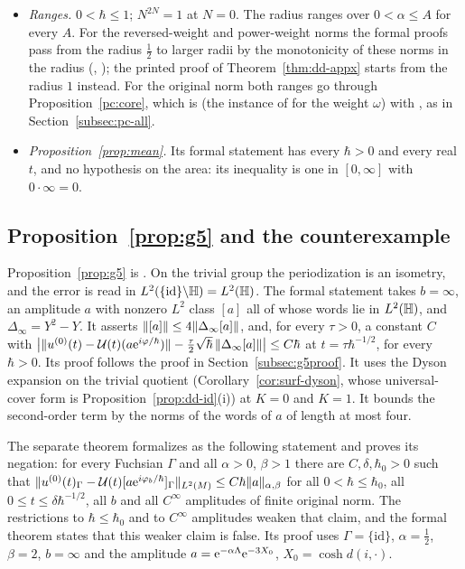 \begin{itemize}
, ).
\item \emph{Ranges.} $0<\hbar\le1$; $N^{2N}=1$ at $N=0$. The radius ranges over $0<\alpha\le A$ for every $A$. For the reversed-weight
and power-weight norms the formal proofs pass from the radius $\tfrac12$ to larger radii by the monotonicity of these norms in the
radius (, ); the printed proof of Theorem~\ref{thm:dd-appx} starts from the radius $1$ instead.
For the original norm both ranges go through Proposition~\ref{pc:core}, which is
 (the instance of  for the weight $\omega$) with , as in Section~\ref{subsec:pc-all}.
\item \emph{Proposition~\ref{prop:mean}.} Its formal statement has every $\hbar>0$ and every real $t$, and no hypothesis on the area:
its inequality is one in $[0,\infty]$ with $0\cdot\infty=0$.
\end{itemize}

\subsection{Proposition~\texorpdfstring{\ref{prop:g5}}{1.6} and the counterexample}\label{rem:g5-lean}
Proposition~\ref{prop:g5} is . On the trivial group the periodization is an isometry, and the error is read in
$L^2(\{\mathrm{id}\}\backslash\mathbb{H})=L^2(\mathbb{H})$. The formal statement takes $b=\infty$, an amplitude $a$ with nonzero $L^2$ class $[a]$ all of whose
words lie in $L^2(\mathbb{H})$, and $\Delta_\infty=Y^2-Y$. It asserts $\lVert [a]\rVert\le4\lVert \Delta_\infty[a]\rVert$, and, for every $\tau>0$, a constant $C$ with
$\bigl|\lVert u^{(0)}(t)-\mathcal{U}(t)(a\mathrm{e}^{i\varphi/\hbar})\rVert-\tfrac\tau2\sqrt\hbar\,\lVert \Delta_\infty[a]\rVert\bigr|\le C\hbar$ at $t=\tau\hbar^{-1/2}$, for every $\hbar>0$.
Its proof follows the proof in Section~\ref{subsec:g5proof}. It uses the Dyson expansion on the trivial quotient
(Corollary~\ref{cor:surf-dyson}, whose universal-cover form is Proposition~\ref{prop:dd-id}(i)) at $K=0$ and $K=1$. It bounds the
second-order term by the norms of the words of $a$ of length at most four.

The separate theorem  formalizes \cite[Theorem~1.3]{S} as the following statement and proves its
negation: for every Fuchsian $\Gamma$ and all $\alpha>0$, $\beta>1$ there are $C,\delta,\hbar_0>0$ such that
$\lVert u^{(0)}(t)_\Gamma-\mathcal{U}(t)[a\mathrm{e}^{i\varphi_b/\hbar}]_\Gamma\rVert_{L^2(M)}\le C\hbar\lVert a\rVert_{\alpha,\beta}$ for all $0<\hbar\le\hbar_0$, all
$0\le t\le\delta\hbar^{-1/2}$, all $b$ and all $C^\infty$ amplitudes of finite original norm. The restrictions to $\hbar\le\hbar_0$ and to
$C^\infty$ amplitudes weaken that claim, and the formal theorem states that this weaker claim is false. Its proof uses
$\Gamma=\{\mathrm{id}\}$, $\alpha=\tfrac12$, $\beta=2$, $b=\infty$ and the amplitude $a=\mathrm{e}^{-\alpha\Lambda}\mathrm{e}^{-3X_0}$, $X_0=\cosh d(i,\cdot)$.

